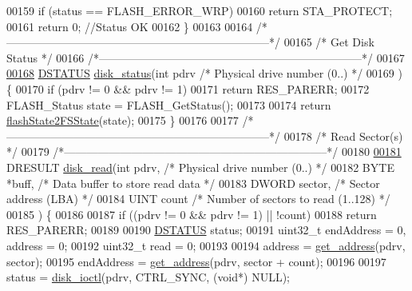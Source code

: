 \begin{DoxyCode}
00159   \textcolor{keywordflow}{if} (status == FLASH\_ERROR\_WRP)
00160     \textcolor{keywordflow}{return} STA\_PROTECT;
00161   \textcolor{keywordflow}{return} 0; \textcolor{comment}{//Status OK}
00162 \}
00163 
00164 \textcolor{comment}{/*-----------------------------------------------------------------------*/}
00165 \textcolor{comment}{/* Get Disk Status                                                       */}
00166 \textcolor{comment}{/*-----------------------------------------------------------------------*/}
00167 
\hypertarget{diskio_8c_source_l00168}{}\hyperlink{diskio_8h_a308c9b0a83724bf6e6aae72a736cc7a6}{00168} \hyperlink{diskio_8h_adba6790898ce4029c20a34b898ce73c1}{DSTATUS} \hyperlink{diskio_8c_a308c9b0a83724bf6e6aae72a736cc7a6}{disk\_status}(\textcolor{keywordtype}{int} pdrv \textcolor{comment}{/* Physical drive number (0..) */}
00169 ) \{
00170   \textcolor{keywordflow}{if} (pdrv != 0 && pdrv != 1)
00171     \textcolor{keywordflow}{return} RES\_PARERR;
00172   FLASH\_Status state = FLASH\_GetStatus();
00173 
00174   \textcolor{keywordflow}{return} \hyperlink{diskio_8c_a3dfe0827b5e2a3a79da131b076adedff}{flashState2FSState}(state);
00175 \}
00176 
00177 \textcolor{comment}{/*-----------------------------------------------------------------------*/}
00178 \textcolor{comment}{/* Read Sector(s)                                                        */}
00179 \textcolor{comment}{/*-----------------------------------------------------------------------*/}
00180 
\hypertarget{diskio_8c_source_l00181}{}\hyperlink{diskio_8h_a9c6f716a2119a650cf3c61bee540be85}{00181} DRESULT \hyperlink{diskio_8c_a9c6f716a2119a650cf3c61bee540be85}{disk\_read}(\textcolor{keywordtype}{int} pdrv, \textcolor{comment}{/* Physical drive number (0..) */}
00182 BYTE *buff, \textcolor{comment}{/* Data buffer to store read data */}
00183 DWORD sector, \textcolor{comment}{/* Sector address (LBA) */}
00184 UINT count \textcolor{comment}{/* Number of sectors to read (1..128) */}
00185 ) \{
00186 
00187   \textcolor{keywordflow}{if} ((pdrv != 0 && pdrv != 1) || !count)
00188     \textcolor{keywordflow}{return} RES\_PARERR;
00189 
00190   \hyperlink{diskio_8h_adba6790898ce4029c20a34b898ce73c1}{DSTATUS} status;
00191   uint32\_t endAddress = 0, address = 0;
00192   uint32\_t read = 0;
00193 
00194   address = \hyperlink{diskio_8c_a713082e3e5375e658a941a3cca667aed}{get\_address}(pdrv, sector);
00195   endAddress = \hyperlink{diskio_8c_a713082e3e5375e658a941a3cca667aed}{get\_address}(pdrv, sector + count);
00196 
00197   status = \hyperlink{diskio_8c_a816bffc54e390c15d03f477133707de5}{disk\_ioctl}(pdrv, CTRL\_SYNC, (\textcolor{keywordtype}{void}*) NULL);

\end{DoxyCode}
